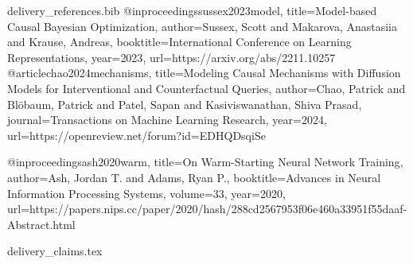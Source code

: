 \begin{filecontents*}[overwrite]{delivery_references.bib}
@inproceedings{sussex2023model,
  title={Model-based Causal Bayesian Optimization},
  author={Sussex, Scott and Makarova, Anastasiia and Krause, Andreas},
  booktitle={International Conference on Learning Representations}, year={2023},
  url={https://arxiv.org/abs/2211.10257}}
@article{chao2024mechanisms,
  title={Modeling Causal Mechanisms with Diffusion Models for Interventional and Counterfactual Queries},
  author={Chao, Patrick and Bl{\"o}baum, Patrick and Patel, Sapan and Kasiviswanathan, Shiva Prasad},
  journal={Transactions on Machine Learning Research}, year={2024},
  url={https://openreview.net/forum?id=EDHQDsqiSe}}

@inproceedings{ash2020warm,
  title={On Warm-Starting Neural Network Training},
  author={Ash, Jordan T. and Adams, Ryan P.},
  booktitle={Advances in Neural Information Processing Systems},
  volume={33}, year={2020},
  url={https://papers.nips.cc/paper/2020/hash/288cd2567953f06e460a33951f55daaf-Abstract.html}}
\end{filecontents*}
\begin{filecontents*}[overwrite]{delivery_claims.tex}
\newcommand{\DeliveryN}{12}
\newcommand{\DeliveryRatio}{0.183}
\newcommand{\DeliveryCILow}{0.102}
\newcommand{\DeliveryCIHigh}{0.327}
\newcommand{\DeliveryP}{0.00146484}
\newcommand{\DeliveryWins}{11}
\newcommand{\WorseSeed}{124753321}
\newcommand{\WorseOnline}{0.196339}
\newcommand{\WorseDelivery}{0.395658}
\newcommand{\WorseRatio}{2.015177}
\newcommand{\ConfirmationChargedCalls}{60,962}
\newcommand{\PersistedConfirmationResponses}{57,636}
\newcommand{\InterruptedConfirmationAttempts}{3,326}
\newcommand{\AOnlineRatio}{0.522}
\newcommand{\AFlatRatio}{0.551}
\newcommand{\AMatchedRatio}{0.423}
\newcommand{\ABufferRatio}{0.096}
\newcommand{\AOptimizationRatio}{0.034}
\newcommand{\AUnusedRatio}{0.980}
\newcommand{\AFitCPU}{10.87}
\newcommand{\AWorseLocalMSE}{8.07\times10^{-5}}
\newcommand{\AWorseChainMSE}{2.86\times10^{-4}}
\newcommand{\AWorseShiftMSE}{2.09\times10^{-4}}
\newcommand{\AWorseOutsidePercent}{0.020}
\newcommand{\AWorseSnapped}{0.397}
\newcommand{\AUnusedWins}{10}
\newcommand{\AUnusedMin}{0.644}
\newcommand{\AUnusedMax}{2.874}
\newcommand{\AUnusedSnappedRatio}{0.469}
\newcommand{\AFlatInitOneRatio}{0.458}
\newcommand{\AFlatInitTwoRatio}{0.519}
\newcommand{\CRollingWins}{7}
\newcommand{\CPhysicsWins}{3}
\newcommand{\CFourierWins}{0}
\newcommand{\CCPU}{0.053}
\end{filecontents*}

